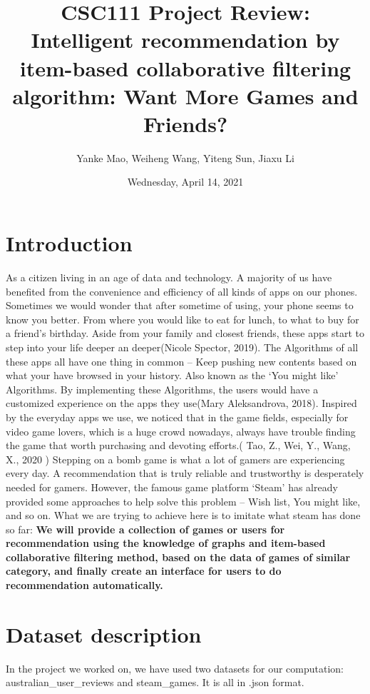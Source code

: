 \documentclass[fontsize=11pt]{article}
\title{CSC111 Project Review: Intelligent recommendation by item-based collaborative filtering algorithm: Want More Games and Friends?}
\author{Yanke Mao, Weiheng Wang, Yiteng Sun, Jiaxu Li}
\date{Wednesday, April 14, 2021}
\begin{document}
    \maketitle

    \section*{Introduction}
    
    As a citizen living in an age of data and technology. A majority of us have benefited from the convenience and efficiency of all kinds of apps on our phones. Sometimes we would wonder that after sometime of using, your phone seems to know you better. From where you would like to eat for lunch, to what to buy for a friend's birthday. Aside from your family and closest friends, these apps start to step into your life deeper an deeper(Nicole Spector, 2019). The Algorithms of all these apps all have one thing in common -- Keep pushing new contents based on what your have browsed in your history. Also known as the ‘You might like’ Algorithms. By implementing these Algorithms, the users would have a customized experience on the apps they use(Mary Aleksandrova, 2018). Inspired by the everyday apps we use, we noticed that in the game fields, especially for video game lovers, which is a huge crowd nowadays, always have trouble finding the game that worth purchasing and devoting efforts.( Tao, Z., Wei, Y., Wang, X., 2020 ) Stepping on a bomb game is what a lot of gamers are experiencing every day. A recommendation that is truly reliable and trustworthy is desperately needed for gamers. However, the famous game platform ‘Steam’ has already provided some approaches to help solve this problem -- Wish list, You might like, and so on. What we are trying to achieve here is to imitate what steam has done so far: \textbf{We will provide a collection of games or users for recommendation using the knowledge of graphs and item-based collaborative filtering method, based on the data of games of similar category, and finally create an interface for users to do recommendation automatically.}

    \section*{Dataset description}
    
    In the project we worked on, we have used two datasets for our computation: australian\_user\_reviews and steam\_games. It is all in .json format.\\
    
\end{document}
